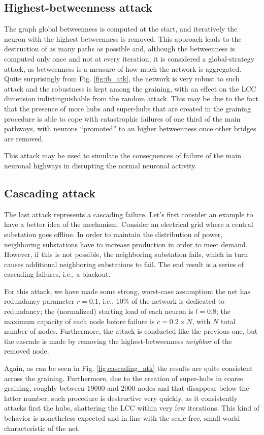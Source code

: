 \subsection{Highest-betweenness attack}
The graph global betweenness is computed at the start, and iteratively the neuron with the highest betweenness is removed. This approach leads to the destruction of as many paths as possible and, although the betweenness is computed only once and not at every iteration, it is considered a global-strategy attack, as betweenness is a measure of how much the network is aggregated. Quite surprisingly from Fig. \ref{fig:ib_atk}, the network is very robust to such attack and the robustness is kept among the graining, with an effect on the LCC dimension indistinguishable from the random attack. This may be due to the fact that the presence of more hubs and super-hubs that are created in the graining procedure is able to cope with catastrophic failures of one third of the main pathways, with neurons ``promoted'' to an higher betweenness once other bridges are removed.

This attack may be used to simulate the consequences of failure of the main neuronal highways in disrupting the normal neuronal activity.
	
\subsection{Cascading attack}
The last attack represents a cascading failure. Let's first consider an example to have a better idea of the mechanism. Consider an electrical grid where a central substation goes offline. In order to maintain the distribution of power, neighboring substations have to increase production in order to meet demand. However, if this is not possible, the neighboring substation fails, which in turn causes additional neighboring substations to fail. The end result is a series of cascading failures, i.e., a blackout.

For this attack, we have made some strong, worst-case assumption: the net has redundancy parameter $r = 0.1$, i.e., 10\% of the network is dedicated to redundancy; the (normalized) starting load of each neuron is $l=0.8$; the maximum capacity of each node before failure is $c = 0.2 \times N$, with $N$ total number of nodes. Furthermore, the attack is conducted like the previous one, but the cascade is made by removing the highest-betweenness \textit{neighbor} of the removed node.

Again, as can be seen in Fig. \ref{fig:cascading_atk} the results are quite consistent across the graining. Furthermore, due to the creation of super-hubs in coarse graining, roughly between $19000$ and $2000$ nodes and that disappear below the latter number, such procedure is destructive very quickly, as it consistently attacks first the hubs, shattering the LCC within very few iterations. This kind of behavior is nonetheless expected and in line with the scale-free, small-world characteristic of the net.

